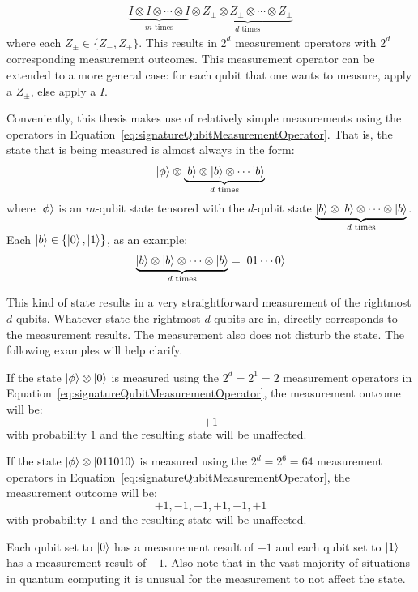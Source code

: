 \begin{align}
\underbrace{I \otimes I \otimes \cdots \otimes I}_{m \text{ times}} \otimes \underbrace{Z_{\pm} \otimes Z_{\pm} \otimes \cdots \otimes Z_{\pm}}_{d \text{ times}} \label{eq:signatureQubitMeasurementOperator}
\end{align}
where each $Z_{\pm} \in \{Z_-, Z_+\}$. This results in $2^d$ measurement operators with $2^d$ corresponding measurement outcomes. This measurement operator can be extended to a more general case: for each qubit that one wants to measure, apply a $Z_{\pm} $, else apply a $I$. 

Conveniently, this thesis makes use of relatively simple measurements using the operators in Equation~\eqref{eq:signatureQubitMeasurementOperator}. That is, the state that is being measured is almost always in the form:
\begin{align}
\ket{\phi} \otimes \underbrace{\ket{b} \otimes \ket{b} \otimes \cdots \ket{b}}_{d \text{ times}} 
\end{align}
where $\ket{\phi}$ is an $m$-qubit state tensored with the $d$-qubit state $\underbrace{\ket{b} \otimes \ket{b} \otimes \cdots \otimes \ket{b}}_{d \text{ times}}$. Each $\ket{b} \in \{\ket{0},\ket{1}\}$, as an example:
\begin{align}
\underbrace{\ket{b} \otimes \ket{b} \otimes \cdots \otimes \ket{b}}_{d \text{ times}} = \ket{01 \cdots 0}
\end{align}

This kind of state results in a very straightforward measurement of the rightmost $d$ qubits. Whatever state the rightmost $d$ qubits are in, directly corresponds to the measurement results. The measurement also does not disturb the state.  The following examples will help clarify.
\begin{example}
If the state $\ket{\phi} \otimes \ket{0}$ is measured using the $2^d = 2^1 = 2$ measurement operators in Equation~\eqref{eq:signatureQubitMeasurementOperator}, the measurement outcome will be:
$$+1$$
with probability $1$ and the resulting state will be unaffected.
\end{example}
\begin{example}
If the state $\ket{\phi} \otimes \ket{011010}$ is measured using the $2^d = 2^6 = 64$ measurement operators in Equation~\eqref{eq:signatureQubitMeasurementOperator}, the measurement outcome will be:
$$+1,-1,-1,+1,-1,+1$$
with probability $1$ and the resulting state will be unaffected.
\end{example}
Each qubit set to $\ket{0}$ has a measurement result of $+1$ and each qubit set to $\ket{1}$ has a measurement result of $-1$. Also note that in the vast majority of situations in quantum computing it is unusual for the measurement to not affect the state.

